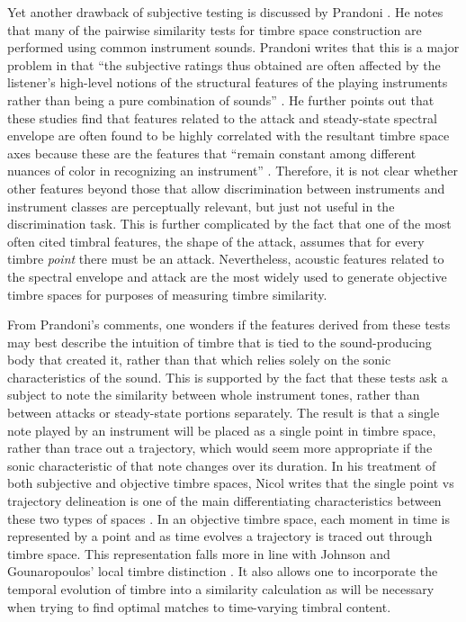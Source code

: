 \documentclass[a4paper,12pt]{report} 	%
\numberwithin{figure}{chapter}
\numberwithin{table}{chapter}
\numberwithin{equation}{chapter}
\begin{document}
\begin{flushleft}
Yet another drawback of subjective testing is discussed by Prandoni \cite{Prandoni:1994th}. He notes that many of the pairwise similarity tests for timbre space construction are performed using common instrument sounds. Prandoni writes that this is a major problem in that ``the subjective ratings thus obtained are often affected by the listener's high-level notions of the structural features of the playing instruments rather than being a pure combination of sounds'' \cite[p. 2]{Prandoni:1994th}. He further points out that these studies find that features related to the attack and steady-state spectral envelope are often found to be highly correlated with the resultant timbre space axes because these are the features that ``remain constant among different nuances of color in recognizing an instrument'' \cite[p. 8]{Prandoni:1994th}. Therefore, it is not clear whether other features beyond those that allow discrimination between instruments and instrument classes are perceptually relevant, but just not useful in the discrimination task. This is further complicated by the fact that one of the most often cited timbral features, the shape of the attack, assumes that for every timbre \emph{point} there must be an attack. Nevertheless, acoustic features related to the spectral envelope and attack are the most widely used to generate objective timbre spaces for purposes of measuring timbre similarity.

From Prandoni's comments, one wonders if the features derived from these tests may best describe the intuition of timbre that is tied to the sound-producing body that created it, rather than that which relies solely on the sonic characteristics of the sound. This is supported by the fact that these tests ask a subject to note the similarity between whole instrument tones, rather than between attacks or steady-state portions separately. The result is that a single note played by an instrument will be placed as a single point in timbre space, rather than trace out a trajectory, which would seem more appropriate if the sonic characteristic of that note changes over its duration. In his treatment of both subjective and objective timbre spaces, Nicol writes that the single point vs trajectory delineation is one of the main differentiating characteristics between these two types of spaces \cite[p. 56]{Nicol:2005rp}. In an objective timbre space, each moment in time is represented by a point and as time evolves a trajectory is traced out through timbre space. This representation falls more in line with Johnson and Gounaropoulos' local timbre distinction \cite{Johnson:2006pi}. It also allows one to incorporate the temporal evolution of timbre into a similarity calculation as will be necessary when trying to find optimal matches to time-varying timbral content.
 

\end{flushleft}
\end{document}
